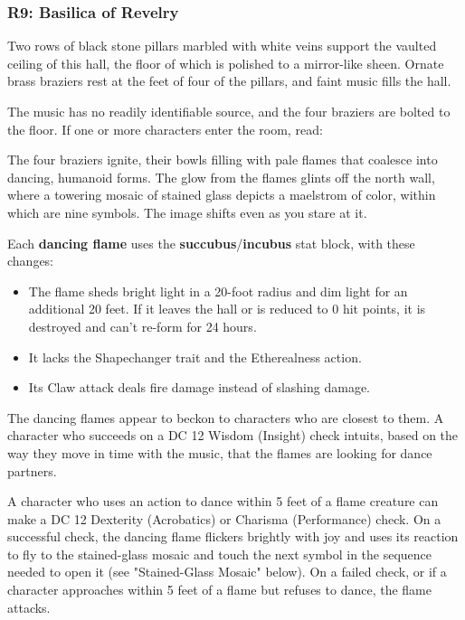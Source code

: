 \documentclass[10pt,a4paper,twoside,fancy,bg=print,twocolumn,openany,nodeprecatedcode]{dndbook}
\begin{document}
\subsubsection{R9: Basilica of Revelry}
\begin{DndReadAloud}{}
Two rows of black stone pillars marbled with white veins support the vaulted ceiling of this hall, the floor of which is polished to a mirror-like sheen. Ornate brass braziers rest at the feet of four of the pillars, and faint music fills the hall.

\end{DndReadAloud}

The music has no readily identifiable source, and the four braziers are bolted to the floor. If one or more characters enter the room, read:

\begin{DndReadAloud}{}
The four braziers ignite, their bowls filling with pale flames that coalesce into dancing, humanoid forms. The glow from the flames glints off the north wall, where a towering mosaic of stained glass depicts a maelstrom of color, within which are nine symbols. The image shifts even as you stare at it.

\end{DndReadAloud}

Each \textbf{dancing flame} uses the \textbf{succubus}/\textbf{incubus} stat block, with these changes:


\begin{itemize}
\item The flame sheds bright light in a 20-foot radius and dim light for an additional 20 feet. If it leaves the hall or is reduced to 0 hit points, it is destroyed and can't re-form for 24 hours.
\item It lacks the Shapechanger trait and the Etherealness action.
\item Its Claw attack deals fire damage instead of slashing damage.
\end{itemize}

The dancing flames appear to beckon to characters who are closest to them. A character who succeeds on a DC 12 Wisdom (Insight) check intuits, based on the way they move in time with the music, that the flames are looking for dance partners.

A character who uses an action to dance within 5 feet of a flame creature can make a DC 12 Dexterity (Acrobatics) or Charisma (Performance) check. On a successful check, the dancing flame flickers brightly with joy and uses its reaction to fly to the stained-glass mosaic and touch the next symbol in the sequence needed to open it (see "Stained-Glass Mosaic" below). On a failed check, or if a character approaches within 5 feet of a flame but refuses to dance, the flame attacks.
\end{document}
